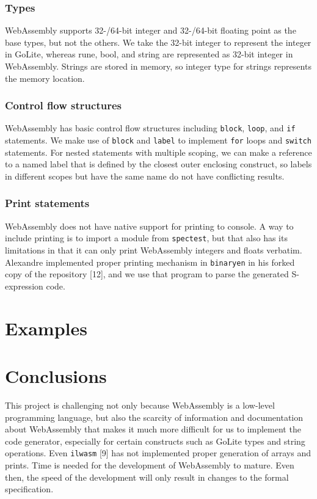 \documentclass{article}
\begin{document}
\subsubsection{Types}
WebAssembly supports 32-/64-bit integer and 32-/64-bit floating point as the base types, but not the others. We take the 32-bit integer to represent the integer in GoLite, whereas rune, bool, and string are represented as 32-bit integer in WebAssembly. Strings are stored in memory, so integer type for strings represents the memory location.

\subsubsection{Control flow structures}
WebAssembly has basic control flow structures including \verb|block|, \verb|loop|, and \verb|if| statements. We make use of \verb|block| and \verb|label| to implement \verb|for| loops and \verb|switch| statements. For nested statements with multiple scoping, we can make a reference to a named label that is defined by the closest outer enclosing construct, so labels in different scopes but have the same name do not have conflicting results.

\subsubsection{Print statements}
WebAssembly does not have native support for printing to console. A way to include printing is to import a module from \verb|spectest|, but that also has its limitations in that it can only print WebAssembly integers and floats verbatim. Alexandre implemented proper printing mechanism in \verb|binaryen| in his forked copy of the repository [12], and we use that program to parse the generated S-expression code.

\section{Examples}


\section{Conclusions}
This project is challenging not only because WebAssembly is a low-level programming language, but also the scarcity of information and documentation about WebAssembly that makes it much more difficult for us to implement the code generator, especially for certain constructs such as GoLite types and string operations. Even \verb|ilwasm| [9] has not implemented proper generation of arrays and prints. Time is needed for the development of WebAssembly to mature. Even then, the speed of the development will only result in changes to the formal specification.
\end{document}
